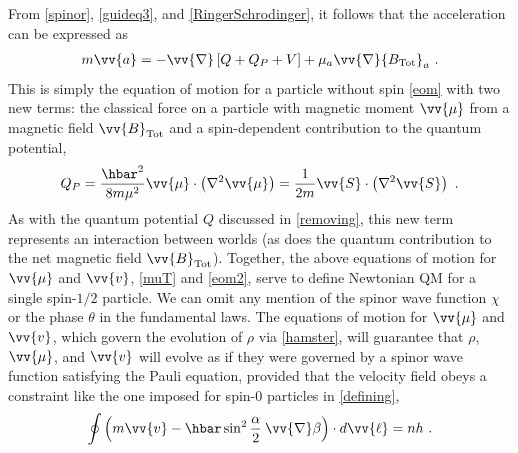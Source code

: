 \documentclass[onecolumn,secnumarabic,balancelastpage,amsmath,amssymb,nofootinbib]{article}
\begin{document}
From \eqref{spinor}, \eqref{guideq3}, and \eqref{RingerSchrodinger}, it follows that the acceleration can be expressed as
\begin{align}
m \vv{a}=-\vv{\nabla}\left[Q+Q_{P}+V\right]+\mu_a \vv{\nabla} {B_{\text{Tot}}}_a\ .
\label{eom2}
\end{align}
This is simply the equation of motion for a particle without spin \eqref{eom} with two new terms: the classical force on a particle with magnetic moment $\vv{\mu}$ from a magnetic field $\vv{B}_{\text{Tot}}$ and a spin-dependent contribution to the quantum potential,
\begin{equation}
Q_P=\frac{\hbar^2}{8 m \mu^2}\vv{\mu}\cdot\left(\nabla^2 \vv{\mu}\right)=\frac{1}{2 m}\vv{S}\cdot\left(\nabla^2 \vv{S}\right)\ .
\end{equation}
As with the quantum potential $Q$ discussed in \textsection \ref{removing}, this new term represents an interaction between worlds (as does the quantum contribution to the net magnetic field $\vv{B}_{\text{Tot}}$).  Together, the above equations of motion for $\vv{\mu}$ and $\vv{v}$,  \eqref{muT} and \eqref{eom2}, serve to define Newtonian QM for a single spin-$1/2$ particle.  We can omit any mention of the spinor wave function $\chi$ or the phase $\theta$ in the fundamental laws.  The equations of motion for $\vv{\mu}$ and $\vv{v}$, which govern the evolution of $\rho$ via \eqref{hamster}, will guarantee that $\rho$, $\vv{\mu}$, and $\vv{v}$ will evolve as if they were governed by a spinor wave function satisfying the Pauli equation, provided that the velocity field obeys a constraint like the one imposed for spin-$0$ particles in \textsection \ref{defining},
\begin{equation}
\oint{\left(m\vv{v}-\hbar \sin^2\frac{\alpha}{2} \: \vv{\nabla}\beta \right)\cdot d\vv{\ell}}=nh\ .
\label{}
\end{equation}
\end{document}
